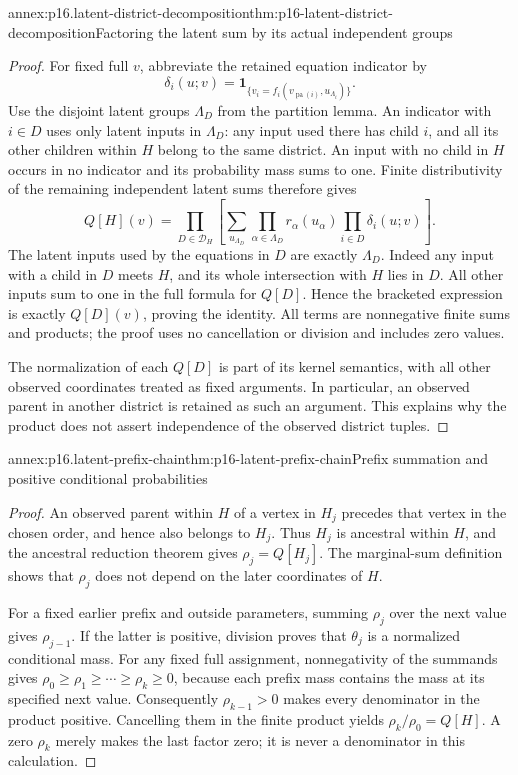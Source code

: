 \begin{annexitem}{annex:p16.latent-district-decomposition}{thm:p16-latent-district-decomposition}{Factoring the latent sum by its actual independent groups}
\begin{proof}
For fixed full \(v\), abbreviate the retained equation indicator by
\[
 \delta_i(u;v)=
 \mathbf1_{\{v_i=f_i(v_{\operatorname{pa}(i)},u_{\Lambda_i})\}}.
\]
Use the disjoint latent groups \(\Lambda_D\) from the partition
lemma. An indicator with \(i\in D\) uses only latent inputs in
\(\Lambda_D\): any input used there has child \(i\), and all
its other children within \(H\) belong to the same district.
An input with no child in \(H\) occurs in no indicator and its
probability mass sums to one. Finite distributivity of the remaining
independent latent sums therefore gives
\[
 Q[H](v)=\prod_{D\in\mathcal D_H}
 \left[
 \sum_{u_{\Lambda_D}}
      \prod_{\alpha\in\Lambda_D}r_\alpha(u_\alpha)
      \prod_{i\in D}\delta_i(u;v)
 \right].
\]
The latent inputs used by the equations in \(D\) are exactly
\(\Lambda_D\). Indeed any input with a child in \(D\) meets
\(H\), and its whole intersection with \(H\) lies in \(D\).
All other inputs sum to one in the full formula for \(Q[D]\).
Hence the bracketed expression is exactly \(Q[D](v)\), proving
the identity. All terms are nonnegative finite sums and products;
the proof uses no cancellation or division and includes zero values.

The normalization of each \(Q[D]\) is part of its kernel semantics,
with all other observed coordinates treated as fixed arguments.
In particular, an observed parent in another district is retained
as such an argument. This explains why the product does not assert
independence of the observed district tuples.
\end{proof}
\end{annexitem}

\begin{annexitem}{annex:p16.latent-prefix-chain}{thm:p16-latent-prefix-chain}{Prefix summation and positive conditional probabilities}
\begin{proof}
An observed parent within \(H\) of a vertex in \(H_j\) precedes
that vertex in the chosen order, and hence also belongs to \(H_j\).
Thus \(H_j\) is ancestral within \(H\), and the ancestral
reduction theorem gives \(\rho_j=Q[H_j]\). The marginal-sum
definition shows that \(\rho_j\) does not depend on the later
coordinates of \(H\).

For a fixed earlier prefix and outside parameters, summing \(\rho_j\)
over the next value gives \(\rho_{j-1}\). If the latter is
positive, division proves that \(\theta_j\) is a normalized
conditional mass. For any fixed full assignment, nonnegativity of
the summands gives
\(\rho_0\geq\rho_1\geq\cdots\geq\rho_k\geq0\), because
each prefix mass contains the mass at its specified next value.
Consequently \(\rho_{k-1}>0\) makes every denominator in the
product positive. Cancelling them in the finite product yields
\(\rho_k/\rho_0=Q[H]\). A zero \(\rho_k\) merely makes the
last factor zero; it is never a denominator in this calculation.
\end{proof}
\end{annexitem}

